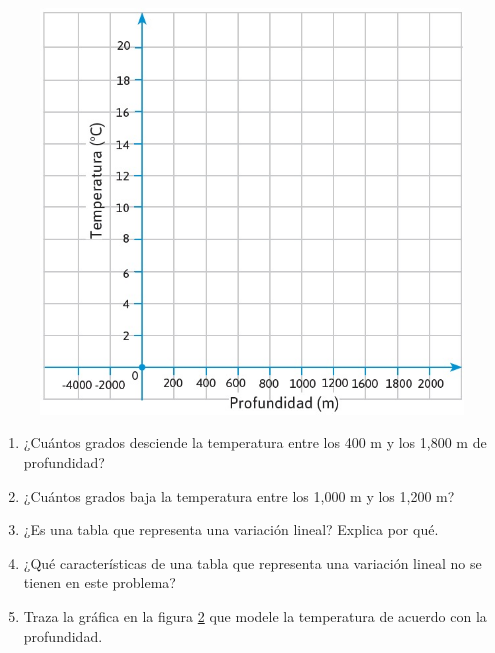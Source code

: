 \documentclass[11pt]{book}
\begin{document}
\begin{enumerate}
\begin{minipage}[t]{0.35\linewidth}
\begin{figure}[H]
            \label{tab:table_bati}
          \end{figure}%
        \end{minipage}\hfill
        \begin{minipage}[t]{0.6\linewidth}
          \begin{figure}[H]
            \centering
            \includegraphics[width=\linewidth]{cartesian_bati.jpg}
            \label{fig:cartesian_bati}
          \end{figure}
        \end{minipage}
        \begin{enumerate}
          \item ¿Cuántos grados desciende la temperatura entre los 400 m y los 1,800 m de profundidad?
          \item ¿Cuántos grados baja la temperatura entre los 1,000 m y los 1,200 m?
          \item ¿Es una tabla que representa una variación lineal? Explica por qué.
          \item ¿Qué características de una tabla que representa una variación lineal no se tienen en este problema?
          \item Traza la gráfica en la figura \ref{fig:cartesian_bati} que modele la temperatura de acuerdo con la profundidad.

\end{enumerate}
\end{enumerate}
\end{document}
